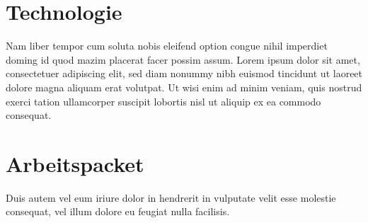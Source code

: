 \documentclass[
a4paper, 			%
12pt,					%
headsepline,	%
ngerman,			%
]{scrartcl} %
\begin{document}
	\newpage
	\section{Technologie}
	Nam liber tempor cum soluta nobis eleifend option congue nihil imperdiet doming id quod mazim placerat facer possim assum. Lorem ipsum dolor sit amet, consectetuer adipiscing elit, sed diam nonummy nibh euismod tincidunt ut laoreet dolore magna aliquam erat volutpat. Ut wisi enim ad minim veniam, quis nostrud exerci tation ullamcorper suscipit lobortis nisl ut aliquip ex ea commodo consequat.
	
	\newpage
	\section{Arbeitspacket}
	Duis autem vel eum iriure dolor in hendrerit in vulputate velit esse molestie consequat, vel illum dolore eu feugiat nulla facilisis.
\end{document}
